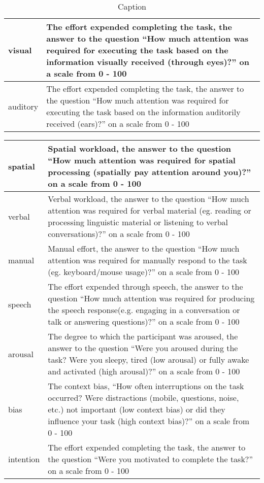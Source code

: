 \begin{table}[]
\begin{tabular}{|l|p{8cm}|}
 visual & The effort expended completing the task, the answer to the question ``How much attention was required for executing the task based on the information visually received (through eyes)?'' on a scale from 0 - 100 \\ \hline
 auditory & The effort expended completing the task, the answer to the question ``How much attention was required for executing the task based on the information auditorily received (ears)?'' on a scale from 0 - 100 \\ \hline
\end{tabular}
\caption{Caption}
\label{tab:my_label}
\end{table} 
 


\begin{table}[]
\centering
\begin{tabular}{|l|p{8cm}|}
\hline
 spatial & Spatial workload, the answer to the question ``How much attention was required for spatial processing (spatially pay attention around you)?'' on a scale from 0 - 100 \\ \hline
 verbal & Verbal workload, the answer to the question ``How much attention was required for verbal material (eg. reading or processing linguistic material or listening to verbal conversations)?'' on a scale from 0 - 100 \\ \hline
 manual & Manual effort, the answer to the question ``How much attention was required for manually respond to the task (eg. keyboard/mouse usage)?'' on a scale from 0 - 100 \\ \hline
 speech & The effort expended through speech, the answer to the question ``How much attention was required for producing the speech response(e.g. engaging in a conversation or talk or answering questions)?'' on a scale from 0 - 100 \\ \hline
 arousal & The degree to which the participant was aroused, the answer to the question ``Were you aroused during the task? Were you sleepy, tired (low arousal) or fully awake and activated (high arousal)?'' on a scale from 0 - 100 \\ \hline
 bias & The context bias, ``How often interruptions on the task occurred? Were distractions (mobile, questions, noise, etc.) not important (low context bias) or did they influence your task (high context bias)?'' on a scale from 0 - 100 \\ \hline
 intention &  The effort expended completing the task, the answer to the question ``Were you motivated to complete the task?'' on a scale from 0 - 100 \\ \hline

\end{tabular}
\end{table}
